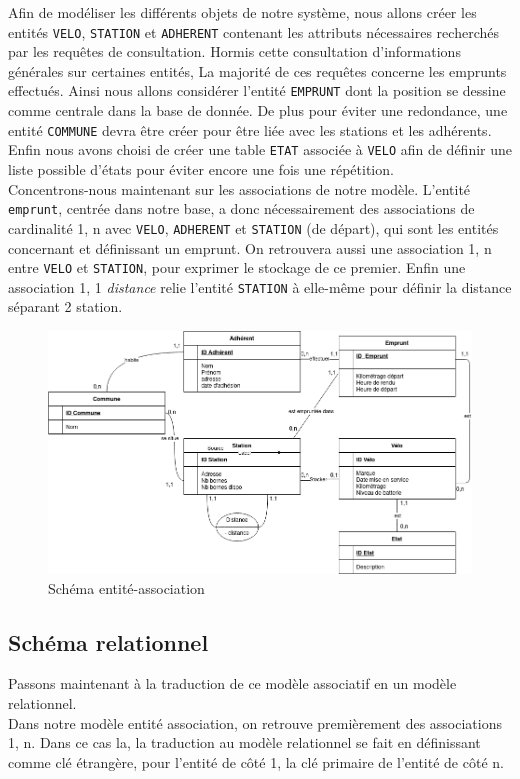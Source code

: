 \documentclass[10pt]{article}
\begin{document}
  Afin de modéliser les différents objets de notre système, nous allons créer les entités \texttt{VELO}, \texttt{STATION} et
  \texttt{ADHERENT} contenant les attributs nécessaires recherchés par les requêtes de consultation.
  Hormis cette consultation d'informations générales sur certaines entités, La majorité de ces requêtes concerne les emprunts effectués.
  Ainsi nous allons considérer l'entité \texttt{EMPRUNT}  dont la position se dessine comme centrale dans la base de donnée.
  De plus pour éviter une redondance, une entité \texttt{COMMUNE} devra être créer pour être liée avec les stations et les adhérents.
  Enfin nous avons choisi de créer une table \texttt{ETAT} associée à \texttt{VELO} afin de définir une liste possible d'états
  pour éviter encore une fois une répétition.\\

  Concentrons-nous maintenant sur les associations de notre modèle. L'entité \texttt{emprunt}, centrée dans notre base, a donc nécessairement
  des associations de cardinalité 1, n avec \texttt{VELO}, \texttt{ADHERENT} et \texttt{STATION} (de départ), qui sont les entités concernant et définissant
  un emprunt.
  On retrouvera aussi une association 1, n entre \texttt{VELO} et \texttt{STATION}, pour exprimer le stockage de ce premier.
  Enfin une association 1, 1 \textit{distance} relie l'entité \texttt{STATION} à elle-même pour définir la distance séparant
  2 station.\\

  \begin{figure}[!h]
    \centering
    \includegraphics[scale=0.5]{entite_association}
    \caption{Schéma entité-association}
    \label{fig:entite}
  \end{figure}

  \subsection{Schéma relationnel}\label{sec:relationel}
  Passons maintenant à la traduction de ce modèle associatif en un modèle relationnel.\\
  Dans notre modèle entité association, on retrouve premièrement des associations 1, n.
  Dans ce cas la, la traduction au modèle relationnel se fait en définissant comme clé étrangère, pour l'entité de côté 1,
  la clé primaire de l'entité de côté n.\\
  
\end{document}
